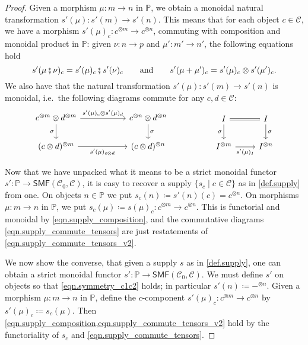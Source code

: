 \documentclass[11pt, oneside, article]{memoir}
\theoremstyle{plain}
\theoremstyle{definition}
\theoremstyle{remark}
\newcommand{\cat}[1]{\mathcal{#1}}%
\newcommand{\Cat}[1]{{\mathsf{#1}}}%
\newcommand{\tpow}[1]{^{\otimes #1}}
\newcommand{\smf}{\Cat{SMF}}
\newcommand{\pp}{\mathbb{P}}
\newcommand{\mob}[1]{#1_0}
\newcommand{\cp}{\mathbin{\fatsemi}}
\newcommand{\qqand}{\qquad\text{and}\qquad}
\begin{document}
\begin{proof}
Given a morphism $\mu\colon m\to n$ in $\pp$, we obtain a monoidal natural transformation $s'(\mu)\colon s'(m)\to s'(n)$. This means that for each object $c\in\cat{C}$, we have a morphism $s'(\mu)_c\colon c\tpow{m}\to c\tpow{n}$, commuting with composition and monoidal product in $\pp$: given $\nu\colon n\to p$ and $\mu'\colon m'\to n'$, the following equations hold
\begin{equation}\label{eqn.supply_composition}
  s'(\mu\cp\nu)_c=s'(\mu)_c\cp s'(\nu)_c
  \qqand
	s'(\mu+\mu')_c=s'(\mu)_c\otimes s'(\mu')_c.
\end{equation}
We also have that the natural transformation $s'(\mu)\colon s'(m)\to s'(n)$ is monoidal, i.e.\ the following diagrams commute for any $c,d\in\cat{C}$:
\begin{equation}\label{eqn.supply_commute_tensors_v2}
\begin{tikzcd}[column sep=55pt]
	c\tpow{m}\otimes d\tpow{m}\ar[r, "s'(\mu)_c\otimes s'(\mu)_d"]\ar[d, "\sigma"']&
	c\tpow{n}\otimes d\tpow{n}\ar[d, "\sigma"]\\
	(c\otimes d)\tpow{m}\ar[r, "s'(\mu)_{c\otimes d}"']&
	(c\otimes d)\tpow{n}
\end{tikzcd}
\hspace{.7in}
\begin{tikzcd}
	I\ar[r, equal]\ar[d, "\sigma"']&
	I\ar[d, "\sigma"]\\
	I\tpow{m}\ar[r, "s'(\mu)_I"']&
	I\tpow{n}
\end{tikzcd}
\end{equation}
 
Now that we have unpacked what it means to be a strict monoidal functor $s'\colon\pp\to\smf(\mob{\cat{C}},\cat{C})$, it is easy to recover a supply $\{s_c\mid c\in\cat{C}\}$ as in \cref{def.supply} from one. On objects $n\in\pp$ we put $s_c(n)\coloneqq s'(n)(c)=c\tpow{n}$. On morphisms $\mu\colon m\to n$ in $\pp$, we put $s_c(\mu)\coloneqq s(\mu)_c\colon c\tpow{m}\to c\tpow{n}$. This is functorial and monoidal by \cref{eqn.supply_composition}, and the commutative diagrams \eqref{eqn.supply_commute_tensors} are just restatements of \eqref{eqn.supply_commute_tensors_v2}.

We now show the converse, that given a supply $s$ as in \cref{def.supply}, one can obtain a strict monoidal functor $s'\colon\pp\to\smf(\mob{\cat{C}},\cat{C})$. We must define $s'$ on objects so that \cref{eqn.symmetry_c1c2} holds; in particular $s'(n)\coloneqq -\tpow{n}$. Given a morphism $\mu\colon m\to n$ in $\pp$, define the $c$-component $s'(\mu)_c\colon c\tpow{m}\to c\tpow{n}$ by $s'(\mu)_c\coloneqq s_c(\mu)$. Then \cref{eqn.supply_composition,eqn.supply_commute_tensors_v2} hold by the functoriality of $s_c$ and \cref{eqn.supply_commute_tensors}.
 

\end{proof}
\end{document}

